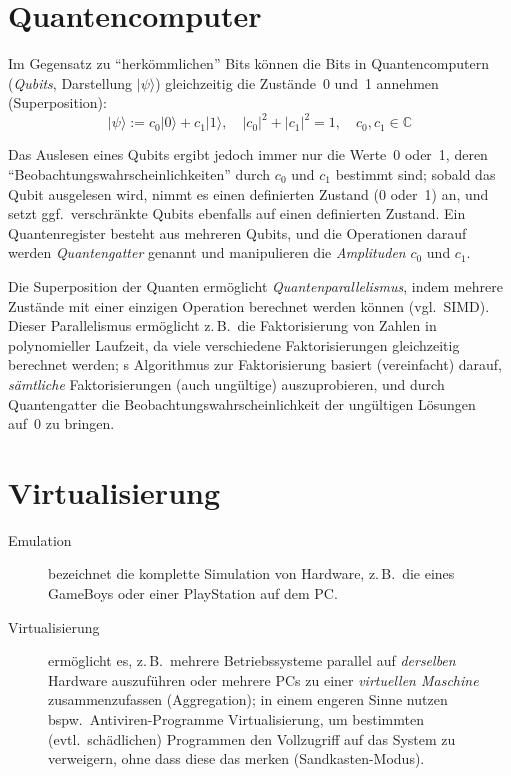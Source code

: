 \section{Quantencomputer}
Im Gegensatz zu \enquote{herkömmlichen} Bits können die Bits in Quantencomputern (\emph{Qubits}, Darstellung $\lvert \psi \rangle$) gleichzeitig die Zustände~0 und~1 annehmen (Superposition):
\[
    \lvert \psi \rangle := c_0 \lvert 0 \rangle + c_1 \lvert 1 \rangle,
    \quad \lvert c_0 \rvert^2 + \lvert c_1 \rvert^2 = 1,
    \quad c_0,c_1 \in \mathbb{C}
\]

Das Auslesen eines Qubits ergibt jedoch immer nur die Werte~0 oder~1, deren \enquote{Beobachtungswahrscheinlichkeiten} durch $c_0$ und $c_1$ bestimmt sind; sobald das Qubit ausgelesen wird, nimmt es einen definierten Zustand (0 oder~1) an, und setzt ggf.~verschränkte Qubits ebenfalls auf einen definierten Zustand.
Ein Quantenregister besteht aus mehreren Qubits, und die Operationen darauf werden \emph{Quantengatter} genannt und manipulieren die \emph{Amplituden} $c_0$ und $c_1$.

Die Superposition der Quanten ermöglicht \emph{Quantenparallelismus}, indem mehrere Zustände mit einer einzigen Operation berechnet werden können (vgl.~SIMD).
Dieser Parallelismus ermöglicht z.\,B.~die Faktorisierung von Zahlen in polynomieller Laufzeit, da viele verschiedene Faktorisierungen gleichzeitig berechnet werden; s Algorithmus zur Faktorisierung basiert (vereinfacht) darauf, \emph{sämtliche} Faktorisierungen (auch ungültige) auszuprobieren, und durch Quantengatter die Beobachtungswahrscheinlichkeit der ungültigen Lösungen auf~0 zu bringen.


\section{Virtualisierung}
\begin{description}
    \item[Emulation] bezeichnet die komplette Simulation von Hardware, z.\,B.~die eines GameBoys oder einer PlayStation auf dem PC.
    \item[Virtualisierung] ermöglicht es, z.\,B.~mehrere Betriebssysteme parallel auf \emph{derselben} Hardware auszuführen oder mehrere PCs zu einer \emph{virtuellen Maschine} zusammenzufassen (Aggregation); in einem engeren Sinne nutzen bspw.~Anti\-viren-Programme Virtualisierung, um bestimmten (evtl.~schädlichen) Programmen den Vollzugriff auf das System zu verweigern, ohne dass diese das merken (Sandkasten-Modus).
\end{description}


